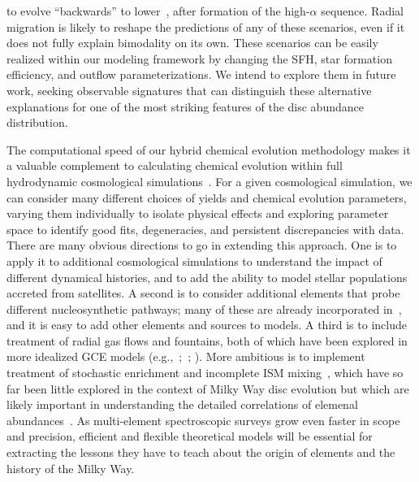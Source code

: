 \documentclass[draft2.tex]{subfiles}
\begin{document}
to evolve ``backwards'' to lower~\feh, after formation of the high-$\alpha$ 
sequence. 
Radial migration is likely to reshape the predictions of any of these scenarios, 
even if it does not fully explain bimodality on its own. 
These scenarios can be easily realized within our modeling framework by 
changing the SFH, star formation efficiency, and outflow parameterizations. 
We intend to explore them in future work, seeking observable signatures that 
can distinguish these alternative explanations for one of the most striking 
features of the disc abundance distribution. 
\par 
The computational speed of our hybrid chemical evolution methodology makes it a 
valuable complement to calculating chemical evolution within full hydrodynamic 
cosmological simulations~\citep[e.g.][]{Mackereth2018, Grand2018, Naiman2018, 
Buck2020b, Vincenzo2020}. 
For a given cosmological simulation, we can consider many different choices of 
yields and chemical evolution parameters, varying them individually to isolate 
physical effects and exploring parameter space to identify good fits, 
degeneracies, and persistent discrepancies with data. 
There are many obvious directions to go in extending this approach. 
One is to apply it to additional cosmological simulations to understand the 
impact of different dynamical histories, and to add the ability to model 
stellar populations accreted from satellites. 
A second is to consider additional elements that probe different 
nucleosynthetic pathways; many of these are already incorporated in~\vice, and 
it is easy to add other elements and sources to models. 
A third is to include treatment of radial gas flows and fountains, both of 
which have been explored in more idealized GCE models (e.g.,~\citealp{Lacey1985, 
Bilitewski2012, Kubryk2015a, Kubryk2015b};~\citealp*{Spitoni2013}; 
\citealp{Pezzulli2016, Sharda2021a, Sharda2021b}). 
More ambitious is to implement treatment of stochastic enrichment and 
incomplete ISM mixing~\citep[e.g.][]{Montes2016, Krumholz2018b, Beniamini2020}, 
which have so far been little explored in the context of Milky Way disc 
evolution but which are likely important in understanding the detailed 
correlations of elemenal abundances~\citep{Ting2021}. 
As multi-element spectroscopic surveys grow even faster in scope and precision, 
efficient and flexible theoretical models will be essential for extracting the 
lessons they have to teach about the origin of elements and the history of the 
Milky Way. 
\end{document}
